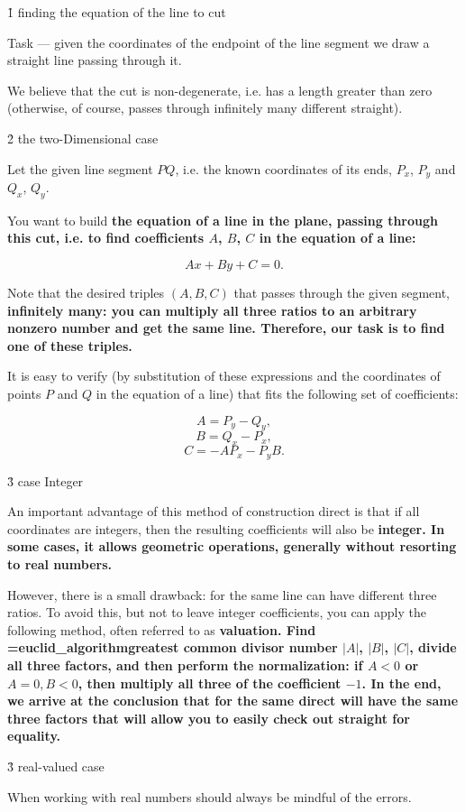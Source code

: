 \h1{ finding the equation of the line to cut }

Task --- given the coordinates of the endpoint of the line segment we draw a straight line passing through it.

We believe that the cut is non-degenerate, i.e. has a length greater than zero (otherwise, of course, passes through infinitely many different straight).


\h2{ the two-Dimensional case }

Let the given line segment $PQ$, i.e. the known coordinates of its ends, $P_x$, $P_y$ and $Q_x$, $Q_y$.

You want to build \bf{the equation of a line in the plane}, passing through this cut, i.e. to find coefficients $A$, $B$, $C$ in the equation of a line:

$$ A x + B y + C = 0. $$

Note that the desired triples $(A,B,C)$ that passes through the given segment, \bf{infinitely many}: you can multiply all three ratios to an arbitrary nonzero number and get the same line. Therefore, our task is to find one of these triples.

It is easy to verify (by substitution of these expressions and the coordinates of points $P$ and $Q$ in the equation of a line) that fits the following set of coefficients:

$$ A = P_y - Q_y, $$
$$ B = Q_x - P_x, $$
$$ C = - A P_x - P_y B. $$


\h3{ case Integer }

An important advantage of this method of construction direct is that if all coordinates are integers, then the resulting coefficients will also be \bf{integer}. In some cases, it allows geometric operations, generally without resorting to real numbers.

However, there is a small drawback: for the same line can have different three ratios. To avoid this, but not to leave integer coefficients, you can apply the following method, often referred to as \bf{valuation}. Find \algohref=euclid_algorithm{greatest common divisor} number $|A|$, $|B|$, $|C|$, divide all three factors, and then perform the normalization: if $A<0$ or $A=0, B<0$, then multiply all three of the coefficient $-1$. In the end, we arrive at the conclusion that for the same direct will have the same three factors that will allow you to easily check out straight for equality.


\h3{ real-valued case }

When working with real numbers should always be mindful of the errors.

